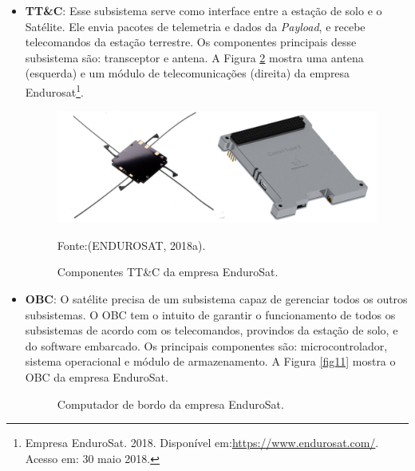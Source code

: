 \begin{itemize}
\begin{figure}[h]
	Fonte: (CLYDE SPACE, 2018, pág.1).\linebreak
	
	\label{fig09}
\end{figure}

    \item \textbf{TT\&C}: Esse subsistema serve como interface entre a estação de solo e o Satélite. Ele envia pacotes de telemetria e dados da \textit{Payload}, e recebe telecomandos da estação terrestre. Os componentes principais desse subsistema são: transceptor e antena. A Figura \ref{fig10} mostra uma antena (esquerda) e um módulo de telecomunicações (direita) da empresa Endurosat\footnote{Empresa EnduroSat. 2018. Disponível em:\url{https://www.endurosat.com/}. Acesso em: 30 maio 2018.}.


\begin{figure}[h]
	\centering
    \caption{Componentes TT\&C da empresa EnduroSat.}
    
	\includegraphics[keepaspectratio=true,scale=2.2]{figuras/tt_c.png}
	
	Fonte:(ENDUROSAT, 2018a).\linebreak
	
	\label{fig10}
\end{figure}


    \item \textbf{OBC}: O satélite precisa de um subsistema capaz de gerenciar todos os outros subsistemas. O OBC tem o intuito de garantir o funcionamento de todos os subsistemas de acordo com os telecomandos, provindos da estação de solo, e do software embarcado. Os principais componentes são: microcontrolador, sistema operacional e módulo de armazenamento.  A Figura \ref{fig11} mostra o OBC da empresa EnduroSat.

\begin{figure}[h]
	\centering
  	
  	\caption{Computador de bordo da empresa EnduroSat.}
  	

\end{figure}
\end{itemize}
